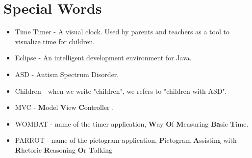 \chapter*{Special Words}

\begin{itemize}

	\item Time Timer - A visual clock. Used by parents and teachers as a tool to visualize time for children.
	\item Eclipse - An intelligent development environment for Java.
	\item ASD - Autism Spectrum Disorder.
	\item Children - when we write "children", we refers to "children with ASD".
	\item MVC - \textbf{M}odel \textbf{V}iew \textbf{C}ontroller \cite{MVC}.
	\item WOMBAT - name of the timer application, \textbf{W}ay \textbf{O}f \textbf{M}easuring \textbf{Ba}sic \textbf{T}ime.
	\item PARROT - name of the pictogram application, \textbf{P}ictogram \textbf{A}ssisting with \textbf{R}hetoric \textbf{R}easoning \textbf{O}r \textbf{T}alking

\end{itemize}